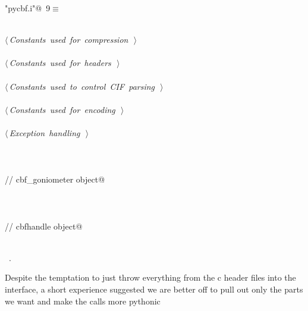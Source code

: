\documentclass[10pt,a4paper,twoside,notitlepage]{article}
\begin{document}
\begin{flushleft} \small\label{scrap7}\raggedright\small
{} \verb@"pycbf.i"@\nobreak\ {\footnotesize {9}}$\equiv$
\vspace{-1ex}
\begin{list}{}{} \item
\mbox{}\verb@@\\
\mbox{}\verb@@\hbox{$\langle\,${\itshape Constants used for compression}\nobreak\ {\footnotesize {}}$\,\rangle$}\verb@@\\
\mbox{}\verb@@\\
\mbox{}\verb@@\hbox{$\langle\,${\itshape Constants used for headers}\nobreak\ {\footnotesize {}}$\,\rangle$}\verb@@\\
\mbox{}\verb@@\\
\mbox{}\verb@@\hbox{$\langle\,${\itshape Constants used to control CIF parsing}\nobreak\ {\footnotesize {}}$\,\rangle$}\verb@@\\
\mbox{}\verb@@\\
\mbox{}\verb@@\hbox{$\langle\,${\itshape Constants used for encoding}\nobreak\ {\footnotesize {}}$\,\rangle$}\verb@@\\
\mbox{}\verb@@\\
\mbox{}\verb@@\hbox{$\langle\,${\itshape Exception handling}\nobreak\ {\footnotesize {}}$\,\rangle$}\verb@@\\
\mbox{}\verb@@\\
\mbox{}\verb@%include "cbfgenericwrappers.i"@\\
\mbox{}\verb@@\\
\mbox{}\verb@@\\
\mbox{}\verb@// cbf_goniometer object@\\
\mbox{}\verb@@\\
\mbox{}\verb@%include "cbfgoniometerwrappers.i"@\\
\mbox{}\verb@@\\
\mbox{}\verb@%include "cbfdetectorwrappers.i"@\\
\mbox{}\verb@@\\
\mbox{}\verb@// cbfhandle object@\\
\mbox{}\verb@%include "cbfhandlewrappers.i"@\\
\mbox{}\verb@@\\
\mbox{}\verb@@{\NWsep}
\end{list}
\vspace{-1.5ex}
\footnotesize
\begin{list}{}{\setlength{\itemsep}{-\parsep}\setlength{\itemindent}{-\leftmargin}}
\item \NWtxtFileDefBy\ .

\item{}
\end{list}
\vspace{4ex}
\end{flushleft}
Despite the temptation to just throw everything from the c header files
into the interface, a short experience suggested we are better off to pull 
out only the parts we want and make the calls more pythonic
\end{document}
